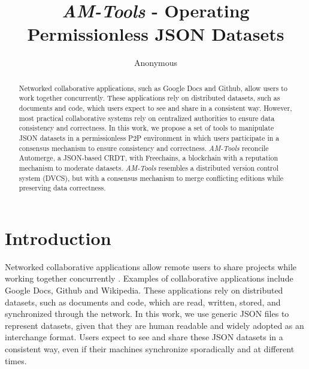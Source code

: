 \documentclass[12pt]{article}
\title{
    \emph{AM-Tools} - Operating Permissionless JSON Datasets
}
\author{Anonymous}
\begin{document}

\maketitle

\begin{abstract}
Networked collaborative applications, such as Google Docs and Github, allow
users to work together concurrently.
These applications rely on distributed datasets, such as documents and code,
which users expect to see and share in a consistent way.
However, most practical collaborative systems rely on centralized authorities
to ensure data consistency and correctness.
%
In this work, we propose a set of tools to manipulate JSON datasets in a
permissionless P2P environment in which users participate in a consensus
mechanism to ensure consistency and correctness.
%
\emph{AM-Tools} reconcile Automerge, a JSON-based CRDT, with Freechains, a
blockchain with a reputation mechanism to moderate datasets.
%
\emph{AM-Tools} resembles a distributed version control system (DVCS), but with
a consensus mechanism to merge conflicting editions while preserving data
correctness.
\end{abstract}

\section{Introduction}
\label{sec.introduction}

Networked collaborative applications allow remote users to share projects while
working together concurrently \cite{wu2010partial}.
Examples of collaborative applications include Google Docs, Github and
Wikipedia.
%
These applications rely on distributed datasets, such as documents and code,
which are read, written, stored, and synchronized through the network.
In this work, we use generic JSON files to represent datasets, given that they
are human readable and widely adopted as an interchange format.
Users expect to see and share these JSON datasets in a consistent way, even if
their machines synchronize sporadically and at different times.
\end{document}
